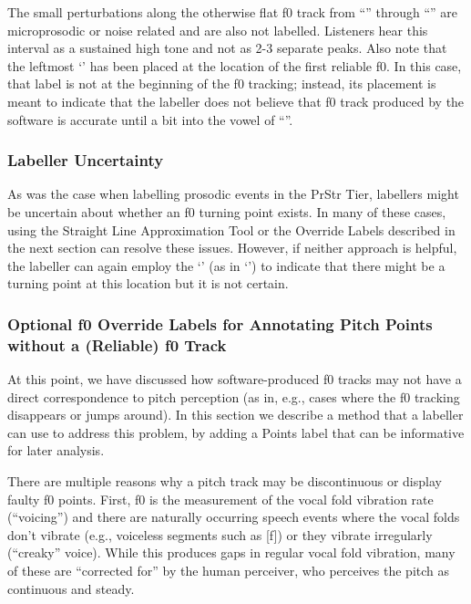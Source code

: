 The small perturbations along the otherwise flat f0 track from “” through “” are microprosodic or noise related and are also not labelled. Listeners hear this interval as a sustained high tone and not as 2-3 separate peaks. Also note that the leftmost ‘’ has been placed at the location of the first reliable f0. In this case, that label is not at the beginning of the f0 tracking; instead, its placement is meant to indicate that the labeller does not believe that f0 track produced by the software is accurate until a bit into the vowel of “”.


\subsubsection{Labeller Uncertainty}\label{sec:labeller-uncertainty-points}

As was the case when labelling prosodic events in the PrStr Tier, labellers might be uncertain about whether an f0 turning point exists. In many of these cases, using the Straight Line Approximation Tool or the Override Labels described in the next section can resolve these issues. However, if neither approach is helpful, the labeller can again employ the ‘’ (as in ‘’) to indicate that there might be a turning point at this location but it is not certain.

\subsubsection{Optional f0 Override Labels for Annotating Pitch Points without a (Reliable) f0 Track}\label{sec:optional-f0-override-labels-for-annotating-pitch-points-without-a-reliable-f0-track}

At this point, we have discussed how software-produced f0 tracks may not have a direct correspondence to pitch perception (as in, e.g., cases where the f0 tracking disappears or jumps around). In this section we describe a method that a labeller can use to address this problem, by adding a Points label that can be informative for later analysis.

There are multiple reasons why a pitch track may be discontinuous or display faulty f0 points. First, f0 is the measurement of the vocal fold vibration rate (“voicing”) and there are naturally occurring speech events where the vocal folds don’t vibrate (e.g., voiceless segments such as [f]) or they vibrate irregularly (“creaky” voice). While this produces gaps in regular vocal fold vibration, many of these are “corrected for” by the human perceiver, who perceives the pitch as continuous and steady.

